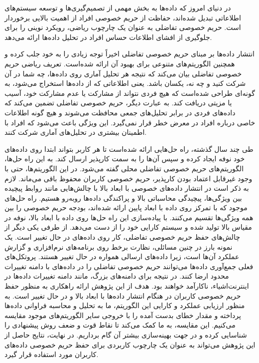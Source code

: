 

در دنیای امروز که داده‌ها به بخش مهمی از تصمیم‌گیری‌ها و توسعه سیستم‌های اطلاعاتی تبدیل شده‌اند، حفاظت از حریم خصوصی افراد از اهمیت بالایی برخوردار است. حریم خصوصی تفاضلی به عنوان یک چارچوب ریاضی، رویکرد نوینی را برای جلوگیری از افشای اطلاعات حساس افراد در تحلیل داده‌ها ارائه می‌دهد.

انتشار داده‌ها بر مبنای حریم خصوصی تفاضلی اخیراً توجه زیادی را به خود جلب کرده و همچنین الگوریتم‌های متنوعی برای بهبود آن ارائه شده‌است. تعریف ریاضی حریم خصوصی تفاضلی بیان می‌کند که نتیجه هر تحلیل آماری روی داده‌ها، چه شما در آن شرکت کنید و چه نه، یکسان باشد. یعنی اطلاعاتی که از داده‌ها استخراج می‌شود، به گونه‌ای طراحی شده‌است که هیچ فردی نتواند از مشارکت یا عدم مشارکت خود، آسیب یا مزیتی دریافت کند. به عبارت دیگر، حریم خصوصی تفاضلی تضمین می‌کند که داده‌های فردی در برابر تحلیل‌های جمعی محافظت می‌شوند و هیچ گونه اطلاعات خاصی درباره افراد در معرض خطر قرار نمی‌گیرد. این ویژگی باعث می‌شود که افراد با اطمینان بیشتری در تحلیل‌های آماری شرکت کنند.

طی چند سال گذشته، راه حل‌هایی ارائه شده‌است تا هر کاربر بتواند ابتدا روی داده‌های خود نوفه ایجاد کرده و سپس آن‌ها را به سمت کارپذیر ارسال کند. به این راه حل‌ها، الگوریتم‌های حریم خصوصی تفاضلی محلی گفته می‌شود. در این الگوریتم‌ها، حتی با وجود غیر‌قابل اعتماد بودن کارپذیر، حریم خصوصی کاربران محفوظ باقی می‌ماند. لازم به ذکر است در انتشار داده‌های خصوصی با ابعاد بالا با چالش‌هایی مانند روابط پیچیده بین ویژگی‌ها، پیچیدگی محاسباتی بالا و پراکندگی داده‌ها روبه‌رو هستیم. راه حل‌های موجود که با تمرکز روی داده با ابعاد پایین ارائه شده‌اند، بودجه حریم خصوصی را بین همه ویژگی‌ها تقسیم می‌کنند. با پیاده‌سازی این راه حل‌ها روی داده با ابعاد بالا، نوفه در مقیاس بالا تولید شده و سیستم کارایی خود را از دست می‌دهد. از طرفی یکی دیگر از چالش‌های حفظ حریم خصوصی تفاضلی، کار روی داده‌های در حال تغییر است. یک نمونه بارز در چنین مسائلی، نظارت برخط روی برنامه‌های نرم‌افزاری و گزارش عملکرد آن‌ها است، زیرا داده‌های ارسالی همواره در حال تغییر هستند. پروتکل‌های فعلی جمع‌آوری داده‌ها می‌توانند حریم خصوصی تفاضلی را در داده‌های با دامنه تغییرات محدود ارضا کنند. در نتیجه برای دامنه‌های بزرگ، مانند دامنه تغییرات داده‌ها در اینترنت‌اشیاء، ناکارآمد خواهند بود. هدف از این پژوهش ارائه راهکاری به منظور حفظ حریم خصوصی کاربران در هنگام انتشار داده‌ها با ابعاد بالا و در حال تغییر است. به منظور ارزیابی عملکرد و کارایی این الگوریتم، ما به تحلیل و محاسبه فراوانی داده‌ها پرداخته و مقدار خطای بدست آمده را با خروجی سایر الگوریتم‌های موجود مقایسه می‌کنیم. این مقایسه، به ما کمک می‌کند تا نقاط قوت و ضعف روش پیشنهادی را شناسایی کرده و در جهت بهینه‌سازی بیشتر آن گام برداریم. در نهایت، نتایج حاصل از این پژوهش می‌تواند به عنوان یک چارچوب کاربردی برای حفظ حریم خصوصی داده‌های کاربران مورد استفاده قرار گیرد.


